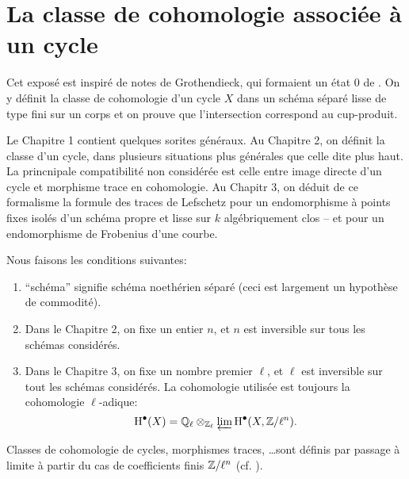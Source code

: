 
\chapter{La classe de cohomologie associée à un cycle}\label{IV}




Cet expos\'e est inspir\'e de notes de Grothendieck, qui formaient un \'etat 0 
de \cite[IV]{sga5}. On y d\'efinit la classe de cohomologie d'un cycle $X$ dans 
un sch\'ema s\'epar\'e lisse de type fini sur un corps et on prouve que 
l'intersection correspond au cup-produit.

Le Chapitre 1 contient quelques sorites g\'en\'eraux. Au Chapitre 2, on 
d\'efinit la classe d'un cycle, dans plusieurs situations plus g\'en\'erales 
que celle dite plus haut. La princnipale compatibilit\'e non consid\'er\'ee est 
celle entre image directe d'un cycle et morphisme trace en cohomologie. Au 
Chapitr 3, on d\'eduit de ce formalisme la formule des traces de Lefschetz pour 
un endomorphisme \`a points fixes isol\'es d'un sch\'ema propre et lisse sur $k$ 
alg\'ebriquement clos -- et pour un endomorphisme de Frobenius d'une courbe. 

Nous faisons les conditions suivantes:
\begin{enumerate}[\indent 1)]
  \item ``sch\'ema'' signifie sch\'ema noeth\'erien s\'epar\'e (ceci est 
    largement un hypoth\`ese de commodit\'e).
  \item Dans le Chapitre 2, on fixe un entier $n$, et $n$ est inversible sur 
    tous les sch\'emas consid\'er\'es.
  \item Dans le Chapitre 3, on fixe un nombre premier $\ell$, et $\ell$ est 
    inversible sur tout les sch\'emas consid\'er\'es. La cohomologie utilis\'ee 
    est toujours la cohomologie $\ell$-adique:
    \[
      \operatorname{H}^\bullet(X) = \mathbb{Q}_\ell\otimes_{\mathbb{Z}_\ell} \varprojlim \operatorname{H}^\bullet(X,\mathbb{Z}/\ell^n) \text{.}
    \]
\end{enumerate}
Classes de cohomologie de cycles, morphismes traces, \ldots sont d\'efinis par 
passage \`a limite \`a partir du cas de coefficients finis $\mathbb{Z}/\ell^n$ (cf. 
\cite[VI]{sga5}).




















